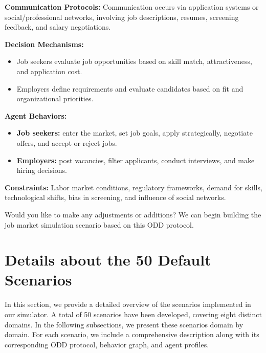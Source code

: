 \documentclass{article}
\theoremstyle{definition}
\theoremstyle{theorem}
\theoremstyle{proof}
\theoremstyle{remark}
\begin{document}
\begin{tcolorbox}
\begin{tcolorbox}[
    colback=gray!5,
    colframe=gray!40!black,
    boxrule=0.3mm,
    arc=1mm
]
\textbf{Communication Protocols:}
Communication occurs via application systems or social/professional networks, involving job descriptions, resumes, screening feedback, and salary negotiations.

\textbf{Decision Mechanisms:}
\begin{itemize}
    \item Job seekers evaluate job opportunities based on skill match, attractiveness, and application cost.
    \item Employers define requirements and evaluate candidates based on fit and organizational priorities.
\end{itemize}

\textbf{Agent Behaviors:}
\begin{itemize}
    \item \textbf{Job seekers:} enter the market, set job goals, apply strategically, negotiate offers, and accept or reject jobs.
    \item \textbf{Employers:} post vacancies, filter applicants, conduct interviews, and make hiring decisions.
\end{itemize}

\textbf{Constraints:}
Labor market conditions, regulatory frameworks, demand for skills, technological shifts, bias in screening, and influence of social networks.
\end{tcolorbox}

Would you like to make any adjustments or additions? We can begin building the job market simulation scenario based on this ODD protocol.

\end{tcolorbox}



    
    \section{Details about the 50 Default Scenarios}\label{app:detail}
    In this section, we provide a detailed overview of the scenarios implemented in our simulator. A total of 50 scenarios have been developed, covering eight distinct domains. In the following subsections, we present these scenarios domain by domain. For each scenario, we include a comprehensive description along with its corresponding ODD protocol, behavior graph, and agent profiles.

\end{document}

